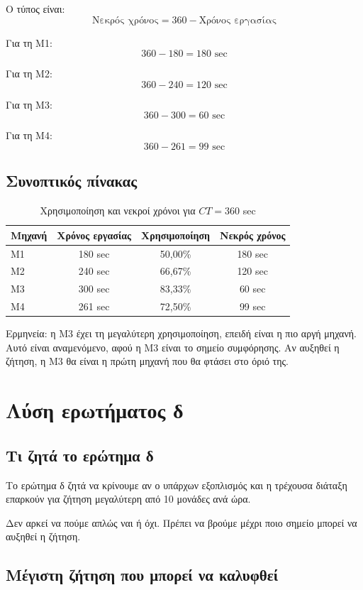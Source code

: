 \documentclass[12pt,a4paper]{article}
\begin{document}
Ο τύπος είναι:
\[
\text{Νεκρός χρόνος}=360-\text{Χρόνος εργασίας}
\]

Για τη Μ1:
\[
360-180=180 \text{ sec}
\]

Για τη Μ2:
\[
360-240=120 \text{ sec}
\]

Για τη Μ3:
\[
360-300=60 \text{ sec}
\]

Για τη Μ4:
\[
360-261=99 \text{ sec}
\]

\subsection{Συνοπτικός πίνακας}

\begin{table}[H]
\centering
\caption{Χρησιμοποίηση και νεκροί χρόνοι για \(CT=360\) sec}
\small
\begin{tabular}{lccc}
\toprule
\textbf{Μηχανή} & \textbf{Χρόνος εργασίας} & \textbf{Χρησιμοποίηση} & \textbf{Νεκρός χρόνος} \\
\midrule
Μ1 & 180 sec & 50,00\% & 180 sec \\
Μ2 & 240 sec & 66,67\% & 120 sec \\
Μ3 & 300 sec & 83,33\% & 60 sec \\
Μ4 & 261 sec & 72,50\% & 99 sec \\
\bottomrule
\end{tabular}
\end{table}

Ερμηνεία: η Μ3 έχει τη μεγαλύτερη χρησιμοποίηση, επειδή είναι η πιο αργή μηχανή. Αυτό είναι αναμενόμενο, αφού η Μ3 είναι το σημείο συμφόρησης. Αν αυξηθεί η ζήτηση, η Μ3 θα είναι η πρώτη μηχανή που θα φτάσει στο όριό της.

\section{Λύση ερωτήματος δ}

\subsection{Τι ζητά το ερώτημα δ}

Το ερώτημα δ ζητά να κρίνουμε αν ο υπάρχων εξοπλισμός και η τρέχουσα διάταξη επαρκούν για ζήτηση μεγαλύτερη από 10 μονάδες ανά ώρα.

Δεν αρκεί να πούμε απλώς ναι ή όχι. Πρέπει να βρούμε μέχρι ποιο σημείο μπορεί να αυξηθεί η ζήτηση.

\subsection{Μέγιστη ζήτηση που μπορεί να καλυφθεί}
\end{document}
